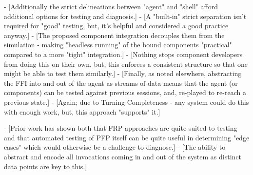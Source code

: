 - [Additionally the strict delineations between "agent" and "shell" afford additional options for testing and diagnosis.]
    - [A "built-in" strict separation isn't required for "good" testing, but, it's helpful and considered a good practice anyway.]
- [The proposed component integration decouples them from the simulation - making "headless running" of the bound components "practical" compared to a more "tight" integration.]
    - [Nothing stops component developers from doing this on their own, but, this enforces a consistent structure so that one might be able to test them similarly.]
- [Finally, as noted elsewhere, abstracting the FFI into and out of the agent as streams of data means that the agent (or components) can be tested against previous sessions, and, re-played to re-reach a previous state.]
    - [Again; due to Turning Completeness - any system could do this with enough work, but, this approach "supports" it.]

- [Prior work has shown both that FRP approaches are quite suited to testing\cite{perez2017testing} and that automated testing of PFP itself can be quite useful in determining "edge cases"\cite{claessen2011quickcheck} which would otherwise be a challenge to diagnose.]
    - [The ability to abstract and encode all invocations coming in and out of the system as distinct data points are key to this.]